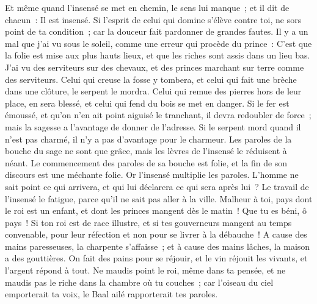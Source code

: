 \begin{multicols}{2}
Et même quand l'insensé se met en chemin, le sens lui manque~; et il dit de chacun~: Il est insensé.
Si l'esprit de celui qui domine s'élève contre toi, ne sors point de ta condition~; car la douceur fait pardonner de grandes fautes.
Il y a un mal que j'ai vu sous le soleil, comme une erreur qui procède du prince~:
C'est que la folie est mise aux plus hauts lieux, et que les riches sont assis dans un lieu bas.
J'ai vu des serviteurs sur des chevaux, et des princes marchant sur terre comme des serviteurs.
Celui qui creuse la fosse y tombera, et celui qui fait une brèche dans une clôture, le serpent le mordra.
Celui qui remue des pierres hors de leur place, en sera blessé, et celui qui fend du bois se met en danger.
Si le fer est émoussé, et qu'on n'en ait point aiguisé le tranchant, il devra redoubler de force~; mais la sagesse a l'avantage de donner de l'adresse.
Si le serpent mord quand il n'est pas charmé, il n'y a pas d'avantage pour le charmeur.
Les paroles de la bouche du sage ne sont que grâce, mais les lèvres de l'insensé le réduisent à néant.
Le commencement des paroles de sa bouche est folie, et la fin de son discours est une méchante folie.
Or l'insensé multiplie les paroles. L'homme ne sait point ce qui arrivera, et qui lui déclarera ce qui sera après lui~?
Le travail de l'insensé le fatigue, parce qu'il ne sait pas aller à la ville.
Malheur à toi, pays dont le roi est un enfant, et dont les princes mangent dès le matin~!
Que tu es béni, ô pays~! Si ton roi est de race illustre, et si tes gouverneurs mangent au temps convenable, pour leur réfection et non pour se livrer à la débauche~!
A cause des mains paresseuses, la charpente s'affaisse~; et à cause des mains lâches, la maison a des gouttières.
On fait des pains pour se réjouir, et le vin réjouit les vivants, et l'argent répond à tout.
Ne maudis point le roi, même dans ta pensée, et ne maudis pas le riche dans la chambre où tu couches~; car l'oiseau du ciel emporterait ta voix, le Baal ailé rapporterait tes paroles.

\end{multicols}
